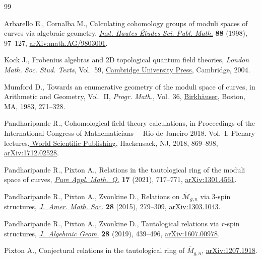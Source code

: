 \begin{thebibliography}{99}
\footnotesize\itemsep=0pt

Arbarello E., Cornalba M., Calculating cohomology groups of moduli spaces of
 curves via algebraic geometry, \href{https://doi.org/10.1007/BF02701767}{\textit{Inst. Hautes \'Etudes Sci. Publ.
 Math.}} \textbf{88} (1998), 97--127, \href{https://arxiv.org/abs/math.AG/9803001}{arXiv:math.AG/9803001}.

Kock J., Frobenius algebras and 2{D} topological quantum field theories,
 \textit{London Math. Soc. Stud. Texts}, Vol.~59, \href{https://doi.org/10.1017/CBO9780511615443}{Cambridge University Press},
 Cambridge, 2004.

Mumford D., Towards an enumerative geometry of the moduli space of curves, in
 Arithmetic and {G}eometry, {V}ol.~{II}, \textit{Progr. Math.}, Vol.~36,
 \href{https://doi.org/10.1007/978-1-4757-9286-7_12}{Birkh\"auser}, Boston, MA, 1983, 271--328.

Pandharipande R., Cohomological field theory calculations, in Proceedings of
 the {I}nternational {C}ongress of {M}athematicians~-- {R}io de {J}aneiro
 2018. {V}ol.~{I}. {P}lenary lectures,\href{https://doi.org/10.1142/9789813272880_0031}{ World Scientific Publishing},
 Hackensack, NJ, 2018, 869--898, \href{https://arxiv.org/abs/1712.02528}{arXiv:1712.02528}.

Pandharipande R., Pixton A., Relations in the tautological ring of the moduli
 space of curves, \href{https://doi.org/10.4310/PAMQ.2021.v17.n2.a7}{\textit{Pure Appl. Math.~Q.}} \textbf{17} (2021), 717--771,
 \href{https://arxiv.org/abs/1301.4561}{arXiv:1301.4561}.

Pandharipande R., Pixton A., Zvonkine D., Relations on {$\overline{\mathcal
 M}_{g,n}$} via {$3$}-spin structures, \href{https://doi.org/10.1090/S0894-0347-2014-00808-0}{\textit{J.~Amer. Math. Soc.}}
 \textbf{28} (2015), 279--309, \href{https://arxiv.org/abs/1303.1043}{arXiv:1303.1043}.

Pandharipande R., Pixton A., Zvonkine D., Tautological relations via {$r$}-spin
 structures, \href{https://doi.org/10.1090/jag/736}{\textit{J.~Algebraic Geom.}} \textbf{28} (2019), 439--496,
 \href{https://arxiv.org/abs/1607.00978}{arXiv:1607.00978}.

Pixton A., Conjectural relations in the tautological ring of
 $\overline{M}_{g,n}$, \href{https://arxiv.org/abs/1207.1918}{arXiv:1207.1918}.


\end{thebibliography}
